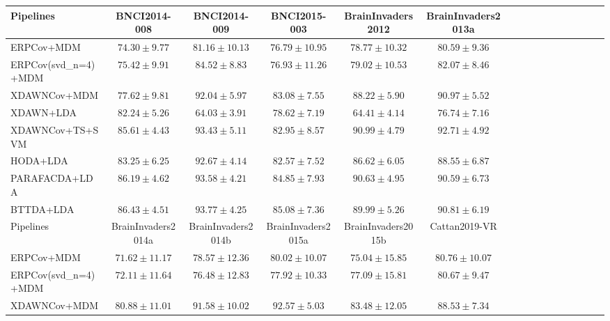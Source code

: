 \begin{tabular}{@{}lccccccccccccccc@{}}
\toprule
          Pipelines &            BNCI2014-008 &            BNCI2014-009 &            BNCI2015-003 &       BrainInvaders2012 &      BrainInvaders2013a \\
\midrule
         ERPCov+MDM &          $74.30\pm9.77$ &         $81.16\pm10.13$ &         $76.79\pm10.95$ &         $78.77\pm10.32$ &          $80.59\pm9.36$ \\
ERPCov(svd_n=4)+MDM &          $75.42\pm9.91$ &          $84.52\pm8.83$ &         $76.93\pm11.26$ &         $79.02\pm10.53$ &          $82.07\pm8.46$ \\
       XDAWNCov+MDM &          $77.62\pm9.81$ &          $92.04\pm5.97$ &          $83.08\pm7.55$ &          $88.22\pm5.90$ &          $90.97\pm5.52$ \\
          XDAWN+LDA &          $82.24\pm5.26$ &          $64.03\pm3.91$ &          $78.62\pm7.19$ &          $64.41\pm4.14$ &          $76.74\pm7.16$ \\
    XDAWNCov+TS+SVM &          $85.61\pm4.43$ &          $93.43\pm5.11$ &          $82.95\pm8.57$ & \boldmath$90.99\pm4.79$ & \boldmath$92.71\pm4.92$ \\
           HODA+LDA &          $83.25\pm6.25$ &          $92.67\pm4.14$ &          $82.57\pm7.52$ &          $86.62\pm6.05$ &          $88.55\pm6.87$ \\
      PARAFACDA+LDA &          $86.19\pm4.62$ &          $93.58\pm4.21$ &          $84.85\pm7.93$ &          $90.63\pm4.95$ &          $90.59\pm6.73$ \\
          BTTDA+LDA & \boldmath$86.43\pm4.51$ & \boldmath$93.77\pm4.25$ & \boldmath$85.08\pm7.36$ &          $89.99\pm5.26$ &          $90.81\pm6.19$ \\
\midrule
          Pipelines &      BrainInvaders2014a &      BrainInvaders2014b &      BrainInvaders2015a &       BrainInvaders2015b &           Cattan2019-VR \\
\midrule
         ERPCov+MDM &         $71.62\pm11.17$ &         $78.57\pm12.36$ &         $80.02\pm10.07$ &          $75.04\pm15.85$ &         $80.76\pm10.07$ \\
ERPCov(svd_n=4)+MDM &         $72.11\pm11.64$ &         $76.48\pm12.83$ &         $77.92\pm10.33$ &          $77.09\pm15.81$ &          $80.67\pm9.47$ \\
       XDAWNCov+MDM &         $80.88\pm11.01$ &         $91.58\pm10.02$ &          $92.57\pm5.03$ &          $83.48\pm12.05$ &          $88.53\pm7.34$ \\

\end{tabular}
